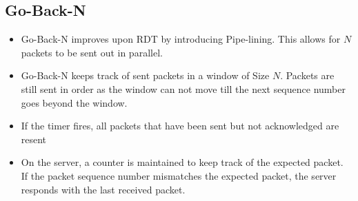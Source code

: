\documentclass[twoside]{article}
\begin{document}
\subsection{Go-Back-N}
\begin{itemize}
\item Go-Back-N improves upon RDT by introducing Pipe-lining. This allows for \(N\) packets to be sent out in parallel.
\item Go-Back-N keeps track of sent packets in a window of Size \(N\). Packets are still sent in order as the window can not move till the next sequence number goes beyond the window. 
\item If the timer fires, all packets that have been sent but not acknowledged are resent
\item On the server, a counter is maintained to keep track of the expected packet. If the packet sequence number mismatches the expected packet, the server responds with the last received packet.
\end{itemize}
\end{document}
